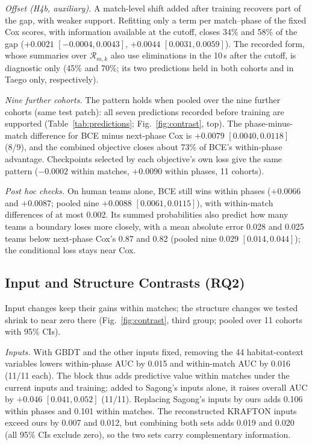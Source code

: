 \documentclass[sigconf,anonymous]{acmart}
\begin{document}
\emph{Offset (H4b, auxiliary).} A match-level shift added after training recovers part of the gap, with weaker support. Refitting only a term per match--phase of the fixed Cox scores, with information available at the cutoff, closes 34\% and 58\% of the gap ($+0.0021$ $[-0.0004,\allowbreak 0.0043]$, $+0.0044$ $[0.0031,\allowbreak 0.0059]$). The recorded form, whose summaries over $\mathcal{R}_{m,k}$ also use eliminations in the 10\,s after the cutoff, is diagnostic only (45\% and 70\%; its two predictions held in both cohorts and in Taego only, respectively).


\emph{Nine further cohorts.} The pattern holds when pooled over the nine further cohorts (same test patch): all seven predictions recorded before training are supported (Table~\ref{tab:predictions}; Fig.~\ref{fig:contrast}, top). The phase-minus-match difference for BCE minus next-phase Cox is $+0.0079$ $[0.0040,\allowbreak 0.0118]$ (8/9), and the combined objective closes about 73\% of BCE's within-phase advantage. Checkpoints selected by each objective's own loss give the same pattern ($-0.0002$ within matches, $+0.0090$ within phases, 11 cohorts).

\emph{Post hoc checks.} On human teams alone, BCE still wins within phases ($+0.0066$ and $+0.0087$; pooled nine $+0.0088$ $[0.0061,\allowbreak 0.0115]$), with within-match differences of at most 0.002. Its summed probabilities also predict how many teams a boundary loses more closely, with a mean absolute error 0.028 and 0.025 teams below next-phase Cox's 0.87 and 0.82 (pooled nine $0.029$ $[0.014,\allowbreak 0.044]$); the conditional loss stays near Cox.

\subsection{Input and Structure Contrasts (RQ2)}
\label{sec:results:inputs}
Input changes keep their gains within matches; the structure changes we tested shrink to near zero there (Fig.~\ref{fig:contrast}, third group; pooled over 11 cohorts with 95\% CIs).

\emph{Inputs.} With GBDT and the other inputs fixed, removing the 44 habitat-context variables lowers within-phase AUC by 0.015 and within-match AUC by 0.016 (11/11 each). The block thus adds predictive value within matches under the current inputs and training; added to Sagong's inputs alone, it raises overall AUC by $+0.046$ $[0.041,\allowbreak 0.052]$ (11/11). Replacing Sagong's inputs by ours adds 0.106 within phases and 0.101 within matches. The reconstructed KRAFTON inputs exceed ours by 0.007 and 0.012, but combining both sets adds 0.019 and 0.020 (all 95\% CIs exclude zero), so the two sets carry complementary information.
\end{document}
